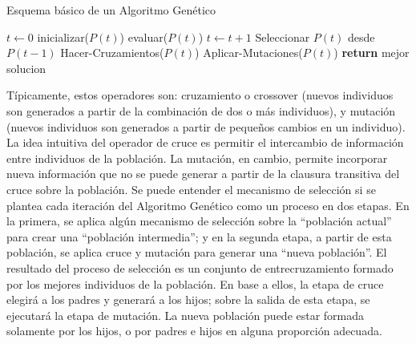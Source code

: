 \documentclass[9pt,a4paper,twoside]{rho-class/rho}
\begin{document}
            \begin{algorithm}
                \caption{Esquema básico de un Algoritmo Genético}
                \begin{algorithmic}[]
                    \State $t \gets 0$
                    \State inicializar($P(t)$)
                    \State evaluar($P(t)$)
                    \State $t \gets t + 1$
                    \State Seleccionar $P(t)$ desde $P(t-1)$
                    \State Hacer-Cruzamientos($P(t)$)
                    \State Aplicar-Mutaciones($P(t)$)
                    \EndWhile
                    \State \textbf{return} mejor solucion
                    \EndProcedure
                \end{algorithmic}
                \label{alg:AG}
            \end{algorithm}

            Típicamente, estos operadores son: cruzamiento o crossover (nuevos individuos son generados a partir de la combinación de dos o más individuos), y mutación (nuevos individuos son generados a partir de pequeños cambios en un individuo).
            La idea intuitiva del operador de cruce es permitir el intercambio de información entre individuos de la población. La mutación, en cambio, permite incorporar nueva información que no se puede generar a partir de la clausura transitiva del cruce sobre la población.
            Se puede entender el mecanismo de selección si se plantea cada iteración del Algoritmo
            Genético como un proceso en dos etapas. En la primera, se aplica algún mecanismo de selección sobre la “población actual” para crear una “población intermedia”; y en la segunda etapa, a partir de esta población, se aplica cruce y mutación para generar una “nueva población”.
            El resultado del proceso de selección es un conjunto de entrecruzamiento formado por los mejores individuos de la población. En base a ellos, la etapa de cruce elegirá a los padres y generará a los hijos; sobre la salida de esta etapa, se ejecutará la etapa de mutación. La nueva población puede estar formada solamente por los hijos, o por padres e hijos en alguna proporción adecuada.

    
\end{document}

